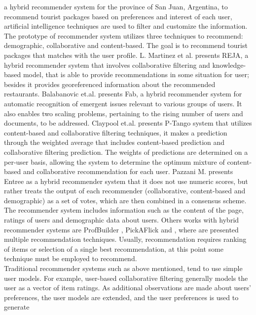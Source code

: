 a hybrid recommender system for the province of San Juan, Argentina, 
to recommend tourist packages  based on preferences and interest 
of each user, artificial intelligence
techniques are used to filter and customize the information. The
prototype of recommender system utilizes three techniques to
recommend: demographic, collaborative and content-based. The goal is
to recommend tourist packages that matches with the user profile.
L. Martinez et al.\cite{martinez2009reja} presents REJA, a hybrid
recommender system that involves collaborative filtering and
knowledge-based model, that is able to provide recommendations in some
situation for user; besides it provides georeferenced information
about the recommended restaurants.
Balabanovic et.al.\cite{balabanovic1997fab} presents
Fab, a hybrid recommender system for automatic recognition of
emergent issues relevant to various groups of users. It also enables
two scaling problems, pertaining to the rising number of users and
documents, to be addressed. Claypool et.al.\cite{claypool1999combining} 
presents P-Tango system that utilizes content-based and collaborative
filtering techniques, it makes a prediction through the weighted
average that includes content-based prediction and collaborative
filtering prediction. The weights of predictions are determined on a
per-user basis, allowing the system to determine the optimum mixture
of content-based and collaborative recommendation for each user.
Pazzani M.\cite{pazzani1999framework} presents Entree as a hybrid
recommender system that it does not use numeric scores, but rather
treats the output of each recommender (collaborative, content-based
and demographic) as a set of votes, which are then combined in a
consensus scheme. The recommender system includes information such as
the content of the page, ratings of users and demographic data about
users. Others works with hybrid recommender systems are ProfBuilder
\cite{al1999semantic}, PickAFlick\cite{burke1999integrating}  and
\cite{tran2000hybrid}, where are presented multiple recommendation
techniques. Usually, recommendation requires ranking of
items or selection of a single best recommendation, at this point some
technique must be employed to recommend. \\ 
Traditional recommender systems such as above mentioned, tend to use
simple user models. For example, user-based collaborative filtering
generally models the user as a vector of item ratings. As additional
observations are made about users’ preferences, the user models are
extended, and the user preferences is used to generate
